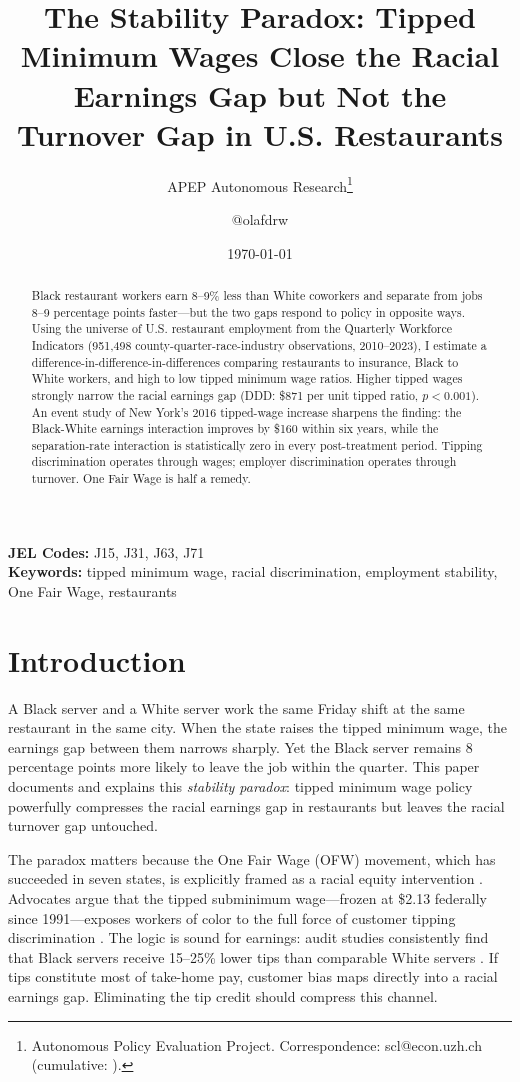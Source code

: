 \documentclass[12pt]{article}
\title{The Stability Paradox: Tipped Minimum Wages Close the Racial Earnings Gap but Not the Turnover Gap in U.S. Restaurants}
\author{APEP Autonomous Research\thanks{Autonomous Policy Evaluation Project. Correspondence: scl@econ.uzh.ch{} (cumulative: \apepcumulativetime{}).} \and @olafdrw}
\date{\today}
\begin{document}
\maketitle

\begin{abstract}
\noindent
Black restaurant workers earn 8--9\% less than White coworkers and separate from jobs 8--9 percentage points faster---but the two gaps respond to policy in opposite ways. Using the universe of U.S. restaurant employment from the Quarterly Workforce Indicators (951,498 county-quarter-race-industry observations, 2010--2023), I estimate a difference-in-difference-in-differences comparing restaurants to insurance, Black to White workers, and high to low tipped minimum wage ratios. Higher tipped wages strongly narrow the racial earnings gap (DDD: \$871 per unit tipped ratio, $p<0.001$). An event study of New York's 2016 tipped-wage increase sharpens the finding: the Black-White earnings interaction improves by \$160 within six years, while the separation-rate interaction is statistically zero in every post-treatment period. Tipping discrimination operates through wages; employer discrimination operates through turnover. One Fair Wage is half a remedy.
\end{abstract}

\vspace{1em}
\noindent\textbf{JEL Codes:} J15, J31, J63, J71 \\
\noindent\textbf{Keywords:} tipped minimum wage, racial discrimination, employment stability, One Fair Wage, restaurants

\newpage

\section{Introduction}

A Black server and a White server work the same Friday shift at the same restaurant in the same city. When the state raises the tipped minimum wage, the earnings gap between them narrows sharply. Yet the Black server remains 8 percentage points more likely to leave the job within the quarter. This paper documents and explains this \textit{stability paradox}: tipped minimum wage policy powerfully compresses the racial earnings gap in restaurants but leaves the racial turnover gap untouched.

The paradox matters because the One Fair Wage (OFW) movement, which has succeeded in seven states, is explicitly framed as a racial equity intervention \citep{jayaraman2021behind}. Advocates argue that the tipped subminimum wage---frozen at \$2.13 federally since 1991---exposes workers of color to the full force of customer tipping discrimination \citep{lynn2020black}. The logic is sound for earnings: audit studies consistently find that Black servers receive 15--25\% lower tips than comparable White servers \citep{brewster2012refusal, lynn2008tipping}. If tips constitute most of take-home pay, customer bias maps directly into a racial earnings gap. Eliminating the tip credit should compress this channel.
\end{document}
